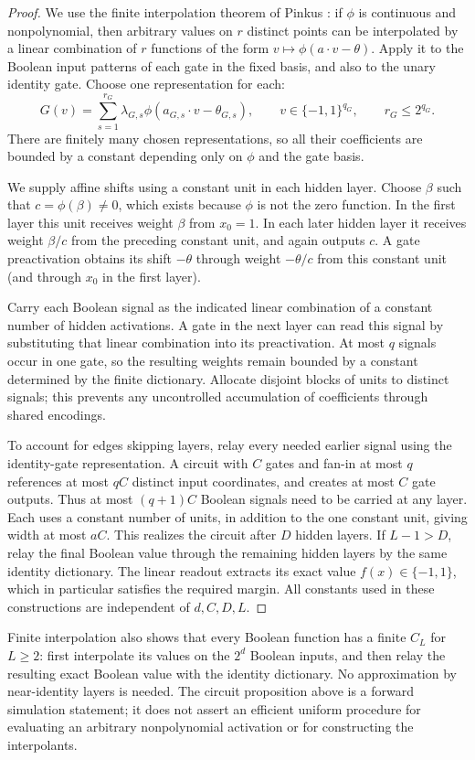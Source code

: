 \begin{proof}
We use the finite interpolation theorem of Pinkus
\cite[Theorem~5.1]{pinkus}: if $\phi$ is continuous and nonpolynomial,
then arbitrary values on $r$ distinct points can be interpolated by a
linear combination of $r$ functions of the form
$v\mapsto\phi(a\cdot v-\theta)$.
Apply it to the Boolean input patterns of each gate in the fixed basis,
and also to the unary identity gate. Choose one representation for each:
\[
 G(v)=\sum_{s=1}^{r_G}\lambda_{G,s}
       \phi(a_{G,s}\cdot v-\theta_{G,s}),
 \qquad v\in\{-1,1\}^{q_G},\qquad r_G\leq2^{q_G}.
\]
There are finitely many chosen representations, so all their coefficients
are bounded by a constant depending only on $\phi$ and the gate basis.

We supply affine shifts using a constant unit in each hidden layer.
Choose $\beta$ such that $c=\phi(\beta)\ne0$, which exists because
$\phi$ is not the zero function. In the first layer this unit receives
weight $\beta$ from $x_0=1$. In each later hidden layer it receives
weight $\beta/c$ from the preceding constant unit, and again outputs $c$.
A gate preactivation obtains its shift $-\theta$ through weight
$-\theta/c$ from this constant unit (and through $x_0$ in the first layer).

Carry each Boolean signal as the indicated linear combination of a
constant number of hidden activations. A gate in the next layer can read
this signal by substituting that linear combination into its
preactivation. At most $q$ signals occur in one gate, so the resulting
weights remain bounded by a constant determined by the finite dictionary.
Allocate disjoint blocks of units to distinct signals; this prevents any
uncontrolled accumulation of coefficients through shared encodings.

To account for edges skipping layers, relay every needed earlier signal
using the identity-gate representation. A circuit with $C$ gates and
fan-in at most $q$ references at most $qC$ distinct input coordinates,
and creates at most $C$ gate outputs. Thus at most $(q+1)C$ Boolean
signals need to be carried at any layer. Each uses a constant number of
units, in addition to the one constant unit, giving width at most $aC$.
This realizes the circuit after $D$ hidden layers. If $L-1>D$, relay
the final Boolean value through the remaining hidden layers by the same
identity dictionary. The linear readout extracts its exact value
$f(x)\in\{-1,1\}$, which in particular satisfies the required margin.
All constants used in these constructions are independent of $d,C,D,L$.
\end{proof}

\begin{remark}
Finite interpolation also shows that every Boolean function has a
finite $C_L$ for $L\geq2$: first interpolate its values on the $2^d$
Boolean inputs, and then relay the resulting exact Boolean value with
the identity dictionary. No approximation by near-identity layers is
needed. The circuit proposition above is a forward simulation statement;
it does not assert an efficient uniform procedure for evaluating an
arbitrary nonpolynomial activation or for constructing the interpolants.
\end{remark}
